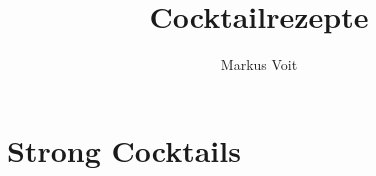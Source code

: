 \documentclass[
  DIV=11,%
  pagesize,%
  fontsize=11pt,%
  paper=a4,%
  numbers=noenddot,
]{scrartcl}
\title{Cocktailrezepte}
\author{Markus Voit}
\begin{document}
\maketitle

\tableofcontents
\clearpage

\section{Strong Cocktails}
\newpage
\newpage
\end{document}
